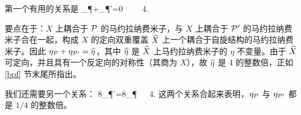 第一个有用的关系是
\be\label{simpler}\eta_\P+\eta_{\P'}=0 ~~~{}~4. \ee

要点在于：$X$ 上耦合于 $\P$ 的马约拉纳费米子，与 $X$ 上耦合于 $\P'$ 的马约拉纳费米子合在一起，构成 $X$ 的定向双重覆盖 $\h X$ 上一个耦合于自旋结构的马约拉纳费米子。因此 $\eta_\P+\eta_{\P'}=\h\eta$，其中 $\h\eta$ 是 $\h X$ 上马约拉纳费米子的 $\eta$ 不变量。由于 $\h X$ 可定向，并且具有一个反定向的对称性（其商为 $X$），故 $\h\eta$ 是 4 的整数倍，正如 \ref{bpf} 节末尾所指出。

我们还需要另一个关系：
\be\label{impler}8\eta_{\P'}=8\eta_\P~~{}~4. \ee
这两个关系合起来表明，$\eta_\P$ 与 $\eta_{\P'}$ 都是 $1/4$ 的整数倍。


